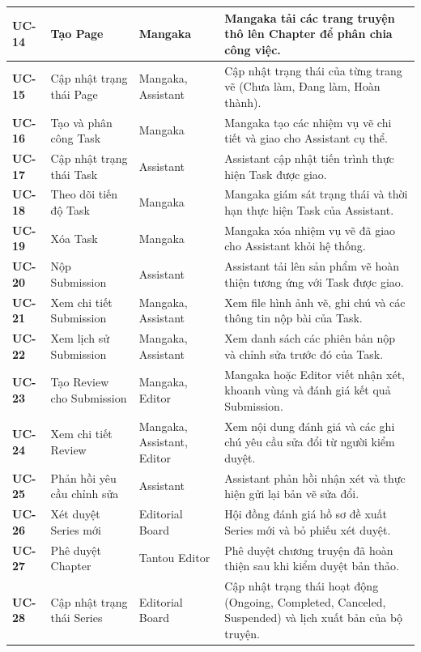 \begin{longtable}{|p{1.3cm}|p{4.2cm}|p{3.2cm}|p{6.0cm}|}
    \textbf{UC-14} & Tạo Page & Mangaka & Mangaka tải các trang truyện thô lên Chapter để phân chia công việc. \\ \hline
    \textbf{UC-15} & Cập nhật trạng thái Page & Mangaka, Assistant & Cập nhật trạng thái của từng trang vẽ (Chưa làm, Đang làm, Hoàn thành). \\ \hline
    \textbf{UC-16} & Tạo và phân công Task & Mangaka & Mangaka tạo các nhiệm vụ vẽ chi tiết và giao cho Assistant cụ thể. \\ \hline
    \textbf{UC-17} & Cập nhật trạng thái Task & Assistant & Assistant cập nhật tiến trình thực hiện Task được giao. \\ \hline
    \textbf{UC-18} & Theo dõi tiến độ Task & Mangaka & Mangaka giám sát trạng thái và thời hạn thực hiện Task của Assistant. \\ \hline
    \textbf{UC-19} & Xóa Task & Mangaka & Mangaka xóa nhiệm vụ vẽ đã giao cho Assistant khỏi hệ thống. \\ \hline
    \textbf{UC-20} & Nộp Submission & Assistant & Assistant tải lên sản phẩm vẽ hoàn thiện tương ứng với Task được giao. \\ \hline
    \textbf{UC-21} & Xem chi tiết Submission & Mangaka, Assistant & Xem file hình ảnh vẽ, ghi chú và các thông tin nộp bài của Task. \\ \hline
    \textbf{UC-22} & Xem lịch sử Submission & Mangaka, Assistant & Xem danh sách các phiên bản nộp và chỉnh sửa trước đó của Task. \\ \hline
    \textbf{UC-23} & Tạo Review cho Submission & Mangaka, Editor & Mangaka hoặc Editor viết nhận xét, khoanh vùng và đánh giá kết quả Submission. \\ \hline
    \textbf{UC-24} & Xem chi tiết Review & Mangaka, Assistant, Editor & Xem nội dung đánh giá và các ghi chú yêu cầu sửa đổi từ người kiểm duyệt. \\ \hline
    \textbf{UC-25} & Phản hồi yêu cầu chỉnh sửa & Assistant & Assistant phản hồi nhận xét và thực hiện gửi lại bản vẽ sửa đổi. \\ \hline
    \textbf{UC-26} & Xét duyệt Series mới & Editorial Board & Hội đồng đánh giá hồ sơ đề xuất Series mới và bỏ phiếu xét duyệt. \\ \hline
    \textbf{UC-27} & Phê duyệt Chapter & Tantou Editor & Phê duyệt chương truyện đã hoàn thiện sau khi kiểm duyệt bản thảo. \\ \hline
    \textbf{UC-28} & Cập nhật trạng thái Series & Editorial Board & Cập nhật trạng thái hoạt động (Ongoing, Completed, Canceled, Suspended) và lịch xuất bản của bộ truyện. \\ \hline

\end{longtable}
